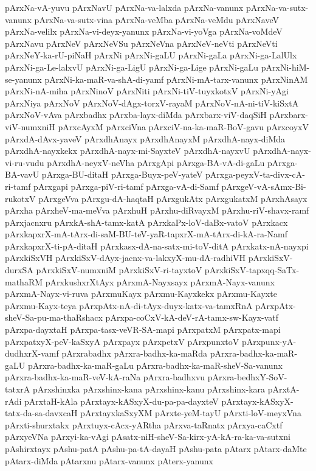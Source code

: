 {pArxNa-vA-yuvu
pArxNavU
pArxNa-va-lalxda
pArxNa-vanunx
pArxNa-va-sutx-vanunx
pArxNa-va-sutx-vina
pArxNa-veMba
pArxNa-veMdu
pArxNaveV
pArxNa-velilx
pArxNa-vi-deyx-yanunx
pArxNa-vi-yoVga
pArxNa-voMdeV
pArxNavu
pArxNeV
pArxNeVSu
pArxNeVna
pArxNeV-neVti
pArxNeVti
pArxNeY-ka-rU-piNaH
pArxNi
pArxNi-gaLU
pArxNi-gaLa
pArxNi-ga-LalUlx
pArxNi-ga-Le-lalxvU
pArxNi-ga-LigU
pArxNi-ga-Lige
pArxNi-gaLu
pArxNi-hiM-se-yanunx
pArxNi-ka-maR-va-shA-di-yamf
pArxNi-mA-tarx-vanunx
pArxNinAM
pArxNi-nA-miha
pArxNinoV
pArxNiti
pArxNi-tiV-tuyxkotxV
pArxNi-yAgi
pArxNiya
pArxNoV
pArxNoV-dAgx-torxV-rayaM
pArxNoV-nA-ni-tiV-kiSxtA
pArxNoV-vAva
pArxbadhx
pArxba-layx-diMda
pArxbarx-viV-daqSiH
pArxbarx-viV-numxniH
pArxcAyxM
pArxciVna
pArxciV-na-ka-maR-BoV-gavu
pArxcoyxV
pArxdA-dAvx-yaveV
pArxdhAnayx
pArxdhAnayxM
pArxdhA-nayx-diMda
pArxdhA-nayxkekx
pArxdhA-nayx-mi-SayxteV
pArxdhA-nayxvU
pArxdhA-nayx-vi-ru-vudu
pArxdhA-neyxV-neVha
pArxgApi
pArxga-BA-vA-di-gaLu
pArxga-BA-vavU
pArxga-BU-ditaH
pArxga-Buyx-peV-yateV
pArxga-peyxV-ta-divx-cA-ri-tamf
pArxgapi
pArxga-piV-ri-tamf
pArxga-vA-di-Samf
pArxgeV-vA-sAmx-Bi-rukotxV
pArxgeVva
pArxgu-dA-haqtaH
pArxgukAtx
pArxgukatxM
pArxhAsayx
pArxha
pArxheV-ma-meVva
pArxhuH
pArxhu-diRvayxM
pArxhu-riV-shavx-ramf
pArxjacnxru
pArxkA-shA-tamx-katA
pArxkaPx-loV-daBx-vatoV
pArxkacx
pArxkapxrX-mA-tArx-di-saM-BU-teV-yaR-tapxrX-mA-tArx-di-kA-ra-Namf
pArxkapxrX-ti-pA-ditaH
pArxkasx-dA-na-satx-mi-toV-ditA
pArxkatx-nA-nayxpi
pArxkiSxVH
pArxkiSxV-dAyx-jacnx-va-lakxyX-mu-dA-radhiVH
pArxkiSxV-durxSA
pArxkiSxV-numxniM
pArxkiSxV-ri-tayxtoV
pArxkiSxV-tapxqq-SaTx-mathaRM
pArxkushxrXtAyx
pArxmA-Nayxsayx
pArxmA-Nayx-vanunx
pArxmA-Nayx-vi-ruva
pArxmuKayx
pArxmu-Kayxkekx
pArxmu-Kayxte
pArxmu-Kayx-teya
pArxpAtx-nA-di-tAyx-duyx-katx-va-tamxRnA
pArxpAtx-sheV-Sa-pu-ma-thaRshacx
pArxpa-coCxV-kA-deV-rA-tamx-sw-Kayx-vatf
pArxpa-dayxtaH
pArxpa-tasx-veVR-SA-mapi
pArxpatxM
pArxpatx-mapi
pArxpatxyX-peV-kaSxyA
pArxpayx
pArxpetxV
pArxpunxtoV
pArxpunx-yA-dudhxrX-vamf
pArxrabadhx
pArxra-badhx-ka-maRda
pArxra-badhx-ka-maR-gaLU
pArxra-badhx-ka-maR-gaLu
pArxra-badhx-ka-maR-sheV-Sa-vanunx
pArxra-badhx-ka-maR-veV-kA-raNa
pArxra-badhxvu
pArxra-bedhxY-SoV-tatxrA
pArxshinxka
pArxshinx-kana
pArxshinx-kanu
pArxshinx-kara
pArxtA-rAdi
pArxtaH-kAla
pArxtayx-kASxyX-du-pa-pa-dayxteV
pArxtayx-kASxyX-tatx-da-sa-davxcaH
pArxtayxkaSxyXM
pArxte-yeM-tayU
pArxti-loV-meyxVna
pArxti-shurxtakx
pArxtuyx-cAcx-yARtha
pArxva-taRnatx
pArxya-caCxtf
pArxyeVNa
pArxyi-ka-vAgi
pAsatx-niH-sheV-Sa-kirx-yA-kA-ra-ka-va-sutxni
pAshirxtayx
pAshu-patA
pAshu-pa-tA-dayaH
pAshu-pata
pAtarx
pAtarx-daMte
pAtarx-diMda
pAtarxnu
pAtarx-vanunx
pAterx-yanunx
}

